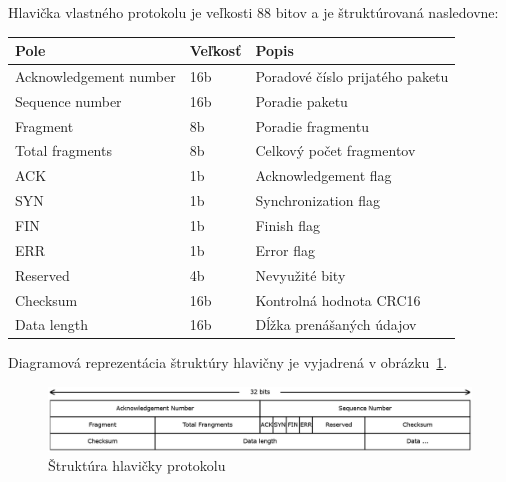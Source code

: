 \documentclass[a4paper,12pt]{article}
\begin{document}
  
    Hlavička vlastného protokolu je veľkosti 88 bitov a je štruktúrovaná nasledovne:
    \begin{longtable}{|l|l|l|}
        \hline
        \textbf{Pole} & \textbf{Veľkosť} & \textbf{Popis} \\
        \hline
	Acknowledgement number & 16b & Poradové číslo prijatého paketu \\
        Sequence number & 16b & Poradie paketu \\
        Fragment & 8b & Poradie fragmentu \\
        Total fragments & 8b & Celkový počet fragmentov \\
        ACK & 1b & Acknowledgement flag \\
        SYN & 1b & Synchronization flag \\
        FIN & 1b & Finish flag \\
        ERR & 1b & Error flag \\
        Reserved & 4b & Nevyužité bity \\
        Checksum & 16b & Kontrolná hodnota CRC16 \\
        Data length & 16b & Dĺžka prenášaných údajov \\
        \hline
    \end{longtable}

	Diagramová reprezentácia štruktúry hlavičny je vyjadrená v obrázku~\ref{fig:header}.

   \begin{figure}[h]
        \centering
        \includegraphics[width=1\textwidth]{protocol_1.png}
        \caption{Štruktúra hlavičky protokolu}
        \label{fig:header}
    \end{figure}
\end{document}
